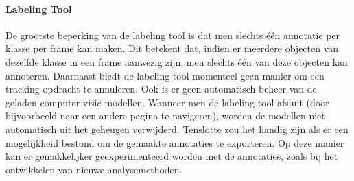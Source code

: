 \paragraph{Labeling Tool}
De grootste beperking van de labeling tool is dat men slechts één annotatie per klasse per frame kan maken.
Dit betekent dat, indien er meerdere objecten van dezelfde klasse in een frame aanwezig zijn, men slechts één van deze objecten kan annoteren.
Daarnaast biedt de labeling tool momenteel geen manier om een tracking-opdracht te annuleren.
Ook is er geen automatisch beheer van de geladen computer-visie modellen. Wanneer men de labeling tool afsluit (door bijvoorbeeld naar een andere pagina te navigeren),
worden de modellen niet automatisch uit het geheugen verwijderd.
Tenslotte zou het handig zijn als er een mogelijkheid bestond om de gemaakte annotaties te exporteren.
Op deze manier kan er gemakkelijker geëxperimenteerd worden met de annotaties, zoals bij het ontwikkelen van nieuwe analysemethoden.
